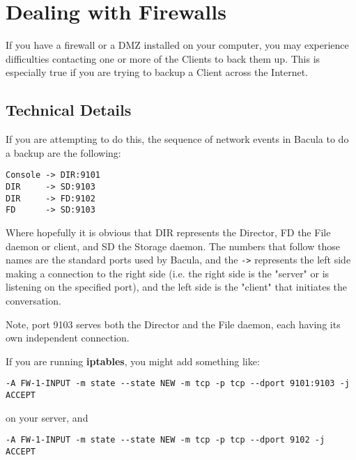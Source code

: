 
\chapter{Dealing with Firewalls}
\label{FirewallsChapter}

If you have a firewall or a DMZ installed on your computer, you may experience
difficulties contacting one or more of the Clients to back them up. This is
especially true if you are trying to backup a Client across the Internet. 

\section{Technical Details}

If you are attempting to do this, the sequence of network events in Bacula to
do a backup are the following: 

\footnotesize
\begin{verbatim}
Console -> DIR:9101
DIR     -> SD:9103
DIR     -> FD:9102
FD      -> SD:9103
\end{verbatim}
\normalsize

Where hopefully it is obvious that DIR represents the Director, FD the File
daemon or client, and SD the Storage daemon. The numbers that follow those
names are the standard ports used by Bacula, and the \verb:->: represents the
left side making a connection to the right side (i.e. the right side is the
"server" or is listening on the specified port), and the left side is the
"client" that initiates the conversation. 

Note, port 9103 serves both the Director and the File daemon, each having its
own independent connection. 

If you are running {\bf iptables}, you might add something like: 

\footnotesize
\begin{verbatim}
-A FW-1-INPUT -m state --state NEW -m tcp -p tcp --dport 9101:9103 -j ACCEPT
\end{verbatim}
\normalsize

on your server, and 

\footnotesize
\begin{verbatim}
-A FW-1-INPUT -m state --state NEW -m tcp -p tcp --dport 9102 -j ACCEPT
\end{verbatim}
\normalsize

